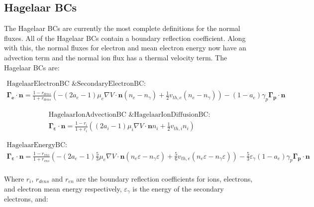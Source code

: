 \documentclass[final]{report}
\begin{document}
  \subsection{Hagelaar BCs}

  The Hagelaar BCs are currently the most complete definitions for the normal fluxes. All of the  Hagelaar BCs contain a boundary reflection coefficient. Along with this, the normal fluxes for electron and mean electron energy now have an advection term and the normal ion flux has a thermal velocity term. The Hagelaar BCs are:

  \begin{equation}
  \begin{gathered}
      \text{HagelaarElectronBC \& SecondaryElectronBC:} \\
      \mathbf{\Gamma_{e}}\cdot\mathbf{n}=\frac{1-r_{dens}}{1+r_{dens}}\left(-(2a_{e}-1)\mu_{e}\nabla V\cdot \mathbf{n}(n_{e}-n_{\gamma})+\frac{1}{2}v_{th,e}(n_{e}-n_{\gamma}) \right)-(1-a_{e})\gamma_{p}\mathbf{\Gamma_{p}}\cdot\mathbf{n}
  \end{gathered}
  \end{equation}


  \begin{equation}
  \begin{gathered}
      \text{HagelaarIonAdvectionBC \& HagelaarIonDiffusionBC:} \\
      \mathbf{\Gamma_{\varepsilon}}\cdot\mathbf{n}=\frac{1-r_{i}}{1+r_{i}}\left((2a_{i}-1)\mu_{i}\nabla V\cdot \mathbf{n}n_{i}+\frac{1}{2}v_{th,i}n_{i} \right)
  \end{gathered}
  \end{equation}

  \begin{equation}
  \begin{gathered}
      \text{HagelaarEnergyBC:} \\
      \mathbf{\Gamma_{\varepsilon}}\cdot\mathbf{n}=\frac{1-r_{ens}}{1+r_{ens}}\left(-(2a_{e}-1)\frac{5}{3}\mu_{e}\nabla V\cdot \mathbf{n}(n_{e}\varepsilon-n_{\gamma}\varepsilon)+\frac{5}{6}v_{th,e}(n_{e}\varepsilon-n_{\gamma}\varepsilon) \right)-\frac{5}{3}\varepsilon_{\gamma}(1-a_{e})\gamma_{p}\mathbf{\Gamma_{p}}\cdot\mathbf{n}
  \end{gathered}
  \end{equation}
  \\
  Where $r_{i}$, $r_{dens}$ and $r_{en}$ are the boundary reflection coefficients for ions, electrons, and electron mean energy respectively, $\varepsilon_{\gamma}$ is the energy of the secondary electrons, and:
\end{document}

